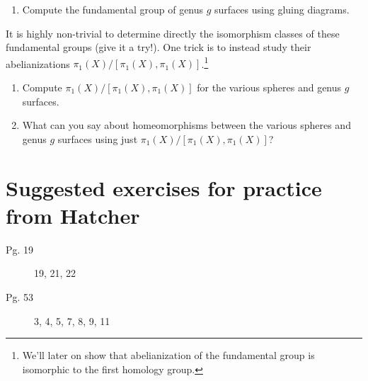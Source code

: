 \documentclass{article}
\begin{document}
\begin{enumerate}[resume]
\begin{enumerate}
        \item Compute the fundamental group of genus $g$ surfaces using gluing diagrams.

    \end{enumerate}
    It is highly non-trivial to determine directly the isomorphism classes of these fundamental groups (give it a try!). One trick is to instead study their abelianizations $\pi_1(X)/[\pi_1(X), \pi_1(X)]$.\footnote{We'll later on show that abelianization of the fundamental group is isomorphic to the first homology group.}
    \begin{enumerate}[resume]
        \item Compute $\pi_1(X)/[\pi_1(X), \pi_1(X)]$ for the various spheres and genus $g$ surfaces.
        \item What can you say about homeomorphisms between the various spheres and genus $g$ surfaces using just $\pi_1(X)/[\pi_1(X), \pi_1(X)]$?
    \end{enumerate}
    
\end{enumerate}


\section*{Suggested exercises for practice from Hatcher}

\begin{description}
    \item[Pg. 19] 19, 21, 22
    \item[Pg. 53] 3, 4, 5, 7, 8, 9, 11
\end{description}
\end{document}
